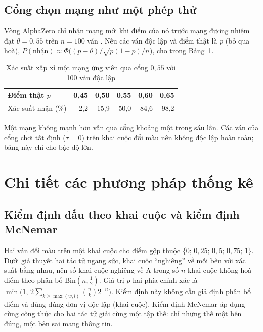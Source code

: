 \subsection{Cổng chọn mạng như một phép thử}
Vòng AlphaZero chỉ nhận mạng mới khi điểm của nó trước mạng đương nhiệm đạt $\theta=0{,}55$ trên $n=100$ ván
\cite{silver2017alphagozero}. Nếu các ván độc lập và điểm thật là $p$ (bỏ qua hoà),
$P(\text{nhận})\approx\Phi\bigl((p-\theta)/\sqrt{p(1-p)/n}\bigr)$, cho trong Bảng~\ref{tab:cs-gating}.
\begin{table}[H]
  \centering\small
  \caption{Xác suất xấp xỉ một mạng ứng viên qua cổng $0{,}55$ với 100 ván độc lập}
  \label{tab:cs-gating}
  \begin{tabular}{lrrrrr}
    \toprule
    Điểm thật $p$ & 0{,}45 & 0{,}50 & 0{,}55 & 0{,}60 & 0{,}65\\
    \midrule
    Xác suất nhận (\%) & 2{,}2 & 15{,}9 & 50{,}0 & 84{,}6 & 98{,}2\\
    \bottomrule
  \end{tabular}
\end{table}
Một mạng không mạnh hơn vẫn qua cổng khoảng một trong sáu lần. Các ván của cổng chơi tất định ($\tau=0$) trên
khai cuộc đổi màu nên không độc lập hoàn toàn; bảng này chỉ cho bậc độ lớn.

\section{Chi tiết các phương pháp thống kê}
\label{sec:cs-tk-lt}
\subsection{Kiểm định dấu theo khai cuộc và kiểm định McNemar}
Hai ván đổi màu trên một khai cuộc cho điểm gộp thuộc $\{0;\,0{,}25;\,0{,}5;\,0{,}75;\,1\}$. Dưới giả thuyết hai tác
tử ngang sức, khai cuộc ``nghiêng'' về mỗi bên với xác suất bằng nhau, nên số khai cuộc nghiêng về A trong số
$n$ khai cuộc không hoà điểm theo phân bố $\mathrm{Bin}(n,\tfrac12)$. Giá trị $p$ hai phía chính xác là
$\min\bigl(1,\,2\sum_{k\ge\max(w,l)}\binom nk 2^{-n}\bigr)$. Kiểm định này không cần giả định phân bố điểm và dùng
đúng đơn vị độc lập (khai cuộc). Kiểm định McNemar \cite{mcnemar1947} áp dụng cùng công thức cho hai tác tử giải
cùng một tập thế: chỉ những thế một bên đúng, một bên sai mang thông tin.

